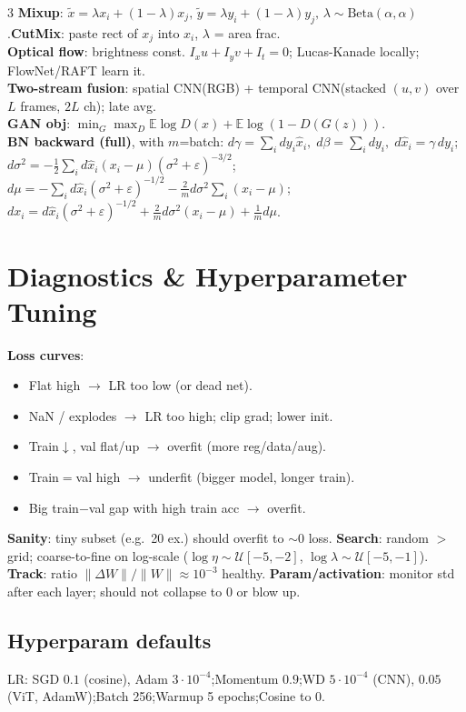 \documentclass[a4paper,9pt,landscape]{scrartcl}
\newcommand{\E}{\mathbb{E}}
\begin{document}
\begin{multicols*}{3}
\textbf{Mixup}: $\tilde x{=}\lambda x_i{+}(1{-}\lambda)x_j,\,\tilde y{=}\lambda y_i{+}(1{-}\lambda)y_j,\,\lambda{\sim}\mathrm{Beta}(\alpha,\alpha)$.\quad\textbf{CutMix}: paste rect of $x_j$ into $x_i$, $\lambda$ = area frac.\\
\textbf{Optical flow}: brightness const. $I_x u+I_y v+I_t=0$; Lucas-Kanade locally; FlowNet/RAFT learn it.\\
\textbf{Two-stream fusion}: spatial CNN(RGB) + temporal CNN(stacked $(u,v)$ over $L$ frames, $2L$ ch); late avg.\\
\textbf{GAN obj}: $\min_G\max_D \E\log D(x)+\E\log(1-D(G(z)))$.\\[1pt]
\textbf{BN backward (full)}, with $m$=batch:
$d\gamma{=}\!\sum_i dy_i\hat x_i,\;d\beta{=}\!\sum_i dy_i,\;d\hat x_i{=}\gamma\,dy_i$;\;
$d\sigma^2{=}-\tfrac12\!\sum_i d\hat x_i(x_i{-}\mu)(\sigma^2{+}\varepsilon)^{-3/2}$;\;
$d\mu{=}-\!\sum_i d\hat x_i(\sigma^2{+}\varepsilon)^{-1/2}-\tfrac{2}{m}d\sigma^2\!\sum_i(x_i{-}\mu)$;\;
$dx_i{=}d\hat x_i(\sigma^2{+}\varepsilon)^{-1/2}+\tfrac{2}{m}d\sigma^2(x_i{-}\mu)+\tfrac{1}{m}d\mu$.

\section{Diagnostics \& Hyperparameter Tuning}
\textbf{Loss curves}:
\begin{itemize}
\item Flat high $\to$ LR too low (or dead net).
\item NaN / explodes $\to$ LR too high; clip grad; lower init.
\item Train$\downarrow$, val flat/up $\to$ overfit (more reg/data/aug).
\item Train$=$val high $\to$ underfit (bigger model, longer train).
\item Big train$-$val gap with high train acc $\to$ overfit.
\end{itemize}
\textbf{Sanity}: tiny subset (e.g.\ 20 ex.) should overfit to $\sim$0 loss.
\textbf{Search}: random $>$ grid; coarse-to-fine on log-scale ($\log\eta\!\sim\!\mathcal U[-5,-2]$, $\log\lambda\!\sim\!\mathcal U[-5,-1]$).
\textbf{Track}: ratio $\|\Delta W\|/\|W\|\!\approx\!10^{-3}$ healthy.
\textbf{Param/activation}: monitor std after each layer; should not collapse to 0 or blow up.

\subsection{Hyperparam defaults}
LR: SGD $0.1$ (cosine), Adam $3{\cdot}10^{-4}$;\;Momentum $0.9$;\;WD $5{\cdot}10^{-4}$ (CNN), $0.05$ (ViT, AdamW);\;Batch 256;\;Warmup 5 epochs;\;Cosine to 0.


\end{multicols*}
\end{document}
